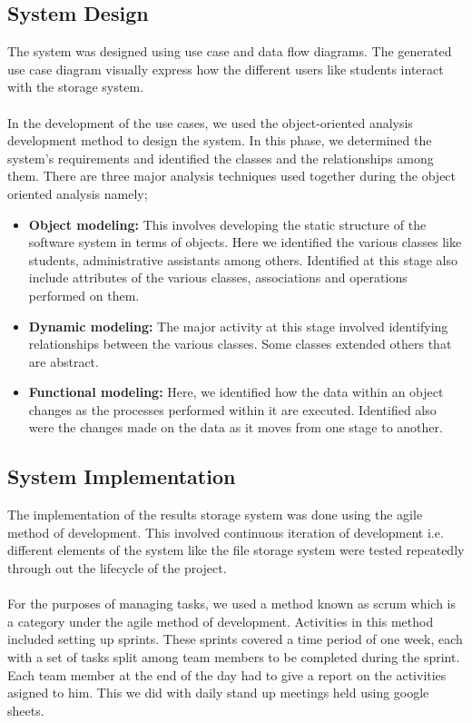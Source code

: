 \subsection{System Design}
The system was designed using use case and data flow diagrams. The generated use case diagram visually express how the different users like students interact with the storage system. \\~\\
In the development of the use cases, we used the object-oriented analysis development method to design the system. In this phase, we determined the system’s requirements and identified the classes and the relationships among them. There are three major analysis techniques used together during the object oriented analysis namely;
\begin{itemize}
\item \textbf{Object modeling:} This involves developing the static structure of the software system in terms of objects. Here we identified the various classes like students, administrative assistants among others. Identified at this stage also include attributes of the various classes, associations and operations performed on them.
\item \textbf{Dynamic modeling:} The major activity at this stage involved identifying relationships between the various classes. Some classes extended others that are abstract.  
\item \textbf{Functional modeling:} Here, we identified how the data within an object changes as the processes performed within it are executed. Identified also were the changes made on the data as it moves from one stage to another.
\end{itemize}

\subsection{System Implementation}
The implementation of the results storage system was done using the agile method of development. This involved continuous iteration  of development i.e. different elements of the system like the file storage system were tested repeatedly through out the lifecycle of the project.\\~\\
For the purposes of managing tasks, we used a method known as scrum which is a category under the agile method of development. Activities in this method included setting up sprints. These sprints covered a time period of one week, each with a set of tasks split among team members to be completed during the sprint. Each team member at the end of the day had to give a report on the activities asigned to him. This we did with daily stand up meetings held using google sheets\cite{art12}.


